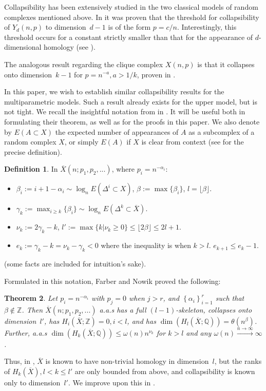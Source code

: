 \documentclass{article}
\newcommand{\crb}[1]{\left\{ #1 \right\}}
\theoremstyle{plain}
\newtheorem{theorem}{Theorem}[section]
\theoremstyle{definition}
\newtheorem{definition}[theorem]{Definition}
\theoremstyle{remark}
\newcommand{\Z}{\mathbb{Z}}
\newcommand{\Q}{\mathbb{Q}}
\newcommand{\di}{dimension}
\begin{document}
Collapsibility has been extensively studied in the two classical models of random complexes mentioned above. In \cite{AronshtamLinialLM13} it was proven that the threshold for collapsibility of $Y_d(n,p)$ to \di\ $d-1$ is of the form $p=c/n$. Interestingly, this threshold occurs for a constant  strictly smaller than that for the appearance of $d$-dimensional homology (see \cite{LinialPeled16}). 

The analogous result regarding the clique complex $X(n,p)$ is that it collapses onto \di\ $k-1$ for $p=n^{-a},a>1/k$, proven in \cite{MALEN23}.

In this paper, we wish to establish similar collapsibility results for the multiparametric models. Such a result already exists for the upper model, but is not tight. 
We recall the insightful notation from \cite{FarberNowik23} in . It will be useful both in formulating their theorem, as well as for the proofs in this paper. We also denote by $E(A\subset X)$ the expected number of appearances of $A$ as a subcomplex of a random complex $X$, or simply $E(A)$ if $X$ is clear from context (see  for the precise definition).
\begin{definition}\label{FNNotation}
    In $\overline{X}(n;p_1,p_2,...)$, where $p_i=n^{-\alpha_i}$:
    \begin{itemize}
        \item $\beta_i:=i+1-\alpha_i\sim \log_n E(\Delta^i\subset X)$, $\beta:=\max\{\beta_i\}$, $l=\lfloor\beta \rfloor$.
        \item $\gamma_k:=\max_{i\ge k}\{\beta_i\}\sim \log_n E(\Delta^k\subset \overline{X})$.
        \item $\nu_k:=2\gamma_k-k$,  $l':=\max\{k| \nu_k\ge 0\}\le \lfloor 2\beta \rfloor\le 2l+1$.
        \item $e_k:=\gamma_k-k=\nu_k-\gamma_k <0$ where the inequality is when $k>l$. $e_{k+1}\le e_k-1$.
    \end{itemize}
    (some facts are included for intuition's sake).
    \end{definition}
Formulated in this notation, Farber and Nowik proved the following:
\begin{theorem}\label{FNResults}
    Let $p_i=n^{-\alpha_i}$ with $p_j=0$ when $j>r$, and $\crb{\alpha_i}_{i=1}^r$ such that $\beta\notin \Z$. Then $\overline{X}(n;p_1,p_2,...)$ a.a.s has a full $(l-1)$-skeleton, collapses onto \di \ $l'$,
    has $H_i(\overline{X};\Z)=0,i<l$,
    and has $\dim(H_l(\overline{X};\Q))=\theta(n^\beta)$. Further, a.a.s $\dim(H_k(\overline{X};\Q))\le \omega(n) n^{\nu_k}$ for $k>l$ and any $\omega(n)\xrightarrow{n\to \infty} \infty$.
\end{theorem}
Thus, in \cite{FarberNowik23}, $\overline{X}$ is known to have non-trivial homology in \di\ $l$, but the ranks of $H_{k}(\overline{X}),l<k\le l'$ are only bounded from above, and collapsibility is known only to \di\ $l'$.
We improve upon this in .
\end{document}
